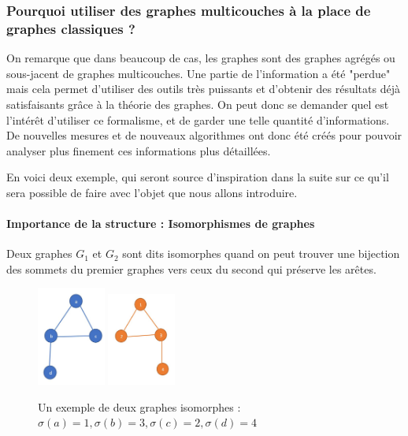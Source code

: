 \documentclass[11pt,a4paper]{article}
\theoremstyle{definition}
\theoremstyle{remark}
\theoremstyle{remark}
\begin{document}
\subsubsection{Pourquoi utiliser des graphes multicouches à la place de graphes classiques ?}

On remarque que dans beaucoup de cas, les graphes sont des graphes agrégés ou sous-jacent de graphes multicouches. Une partie de l'information a été "perdue" mais cela permet d'utiliser des outils très puissants et d'obtenir des résultats déjà satisfaisants grâce à la théorie des graphes. On peut donc se demander quel est l'intérêt d'utiliser ce formalisme, et de garder une telle quantité d'informations. De nouvelles mesures et de nouveaux algorithmes ont donc été créés pour pouvoir analyser plus finement ces informations plus détaillées.

En voici deux exemple, qui seront source d'inspiration dans la suite sur ce qu'il sera possible de faire avec l'objet que nous allons introduire.


\paragraph{Importance de la structure : Isomorphismes de graphes}

Deux graphes $G_1$ et $G_2$ sont dits isomorphes quand on peut trouver une bijection des sommets du premier graphes vers ceux du second qui préserve les arêtes.


\begin{figure}[H]
\centering
	\includegraphics[width=0.2\textwidth]{graph1iso.JPG}
	\includegraphics[width=0.2\textwidth]{graph2iso.JPG} 
	
	\caption{Un exemple de deux graphes isomorphes : $\sigma(a)=1, \sigma(b)=3, \sigma(c)=2, \sigma(d)=4$}
\end{figure}
\end{document}
